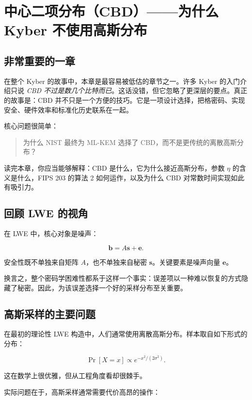 \chapter{中心二项分布（CBD）——为什么 Kyber 不使用高斯分布}
\label{ch:cbd}

\section{非常重要的一章}

在整个 Kyber 的故事中，本章是最容易被低估的章节之一。许多 Kyber 的入门介绍只说\textit{ CBD 不过是数几个比特而已}。这话没错，但它忽略了更深层的要点。真正的故事是：CBD 并不只是一个方便的技巧。它是一项设计选择，把格密码、实现安全、硬件效率和标准化历史联系在一起。

核心问题很简单：

\begin{quote}
为什么 NIST 最终为 ML-KEM 选择了 CBD，而不是更传统的离散高斯分布？
\end{quote}

读完本章，你应当能够解释：CBD 是什么，它为什么接近高斯分布，参数 \(\eta\) 的含义是什么，FIPS 203 的算法 2 如何运作，以及为什么 CBD 对常数时间实现如此有吸引力。

\section{回顾 LWE 的视角}

在 LWE 中，核心对象是噪声：

\[
\mathbf{b}=A\mathbf{s}+\mathbf{e}.
\]

安全性既不单独来自矩阵 \(A\)，也不单独来自秘密 \(\mathbf{s}\)。关键要素是噪声向量 \(\mathbf{e}\)。

换言之，整个密码学困难性都系于这样一个事实：误差项以一种难以恢复的方式隐藏了秘密。因此，为该误差选择一个好的采样分布至关重要。

\section{高斯采样的主要问题}

在最初的理论性 LWE 构造中，人们通常使用离散高斯分布。样本取自如下形式的分布：

\[
\Pr[X=x] \propto e^{-x^2/(2\sigma^2)}.
\]

这在数学上很优雅，但从工程角度看却很棘手。

实际问题在于，高斯采样通常需要代价高昂的操作：

